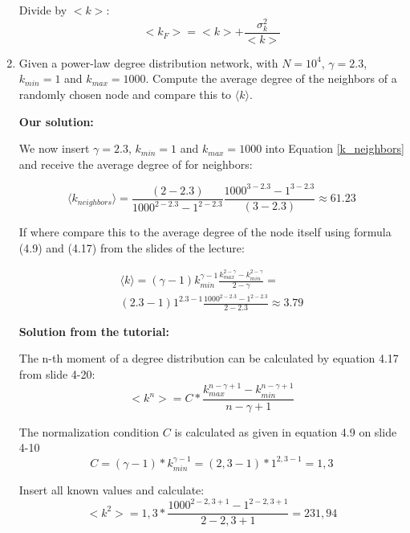 \begin{enumerate}
	Divide by $<k>$:
	\begin{equation*}
		<k_F> = <k> + \frac{\sigma_k^2}{<k>}
	\end{equation*}
	
	\item Given a power-law degree distribution network, with $N = 10^4$, $\gamma = 2.3$, $k_{min} = 1$ and $k_{max} = 1000$. Compute the average degree of the neighbors of a randomly chosen node and compare this to $\langle k \rangle$.
	
	\textbf{Our solution:}
	
	We now insert $\gamma = 2.3$, $k_{min} = 1$ and $k_{max} = 1000$ into Equation \ref{k_neighbors} and receive the average degree of for neighbors:
	
	\begin{equation}
		\langle k_{neighbors} \rangle = \frac{(2-2.3)}{1000^{2-2.3} - 1^{2-2.3}} \frac{1000^{3-2.3} - 1^{3-2.3}}{(3-2.3)} \approx 61.23
	\end{equation}

	If where compare this to the average degree of the node itself using formula (4.9) and (4.17) from the slides of the lecture:
	
	\begin{equation} \label{k_neighbors}
		\begin{split}
			\langle k \rangle = (\gamma-1) k_{min}^{\gamma-1} \frac{k_{max}^{2-\gamma} - k_{min}^{2-\gamma}}{2-\gamma} = \\
			(2.3-1) 1^{2.3-1} \frac{1000^{2-2.3} - 1^{2-2.3}}{2-2.3} \approx 3.79
		\end{split}
	\end{equation}
	
	\textbf{Solution from the tutorial:}
	
	The n-th moment of a degree distribution can be calculated by equation 4.17 from slide 4-20:
	\begin{equation}
		<k^n> = C * \frac{k_{max}^{n-\gamma+1} - k_{min}^{n-\gamma+1}}{n - \gamma + 1}
	\end{equation}

	The normalization condition $C$ is calculated as given in equation 4.9 on slide 4-10
	\begin{equation}
		C = (\gamma - 1) * k_{min}^{\gamma - 1} = (2,3 - 1) * 1^{2,3 - 1} = 1,3
	\end{equation}
	
	Insert all known values and calculate:
	\begin{equation}
		<k^2> = 1,3 * \frac{1000^{2-2,3+1} - 1^{2-2,3+1}}{2 - 2,3 + 1} = 231,94
	\end{equation}
	

\end{enumerate}
